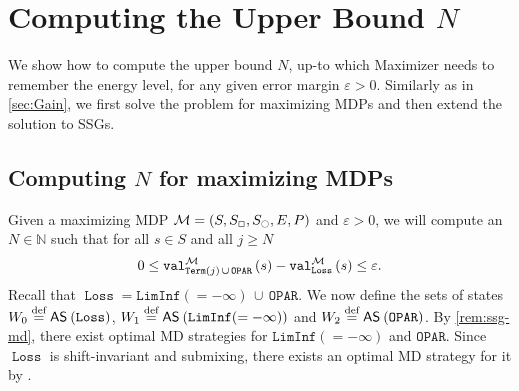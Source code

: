 \documentclass[a4paper,UKenglish,cleveref,autoref,thm-restate]{lipics-v2021}
\DeclareMathOperator{\Term}{\mathtt{Term}}
\DeclareMathOperator{\Loss}{\mathtt{Loss}}
\newcommand{\Oparity}{\mathtt{OPAR}}
\newcommand{\LimInf}[2]{\mathtt{LimInf}(#1 #2)}
\newcommand{\+}[1]{\mathbb{#1}}
\newcommand{\?}[1]{\mathcal{#1}}
\newcommand{\N}{\+{N}}
\newcommand{\rsymbol}{\ocircle}
\newcommand{\zsymbol}{\Box}
\newcommand{\zstates}{\states_\zsymbol}
\newcommand{\rstates}{\states_\rsymbol}
\newcommand{\eqby}[2][=]{\stackrel{\text{{\tiny{#2}}}}{#1}}
\newcommand{\eqdef}{\eqby{def}}
\newcommand{\eps}{\varepsilon}
\newcommand{\lrc}[1]{\left(#1\right)}
\newcommand{\tuple}[1]{\lrc{#1}}
\newcommand{\mdp}{{\mathcal M}}
\newcommand{\mdptuple}{\tuple{\states,\zstates,\rstates,\transition,\probp}}
\newcommand{\states}{S}
\newcommand{\s}{s}
\newcommand{\transition}{{E}}
\newcommand{\probp}{P}
\newcommand{\AS}[2][]{\mathsf{AS}^{#1}\left(#2\right)}
\begin{document}
\section{Computing the Upper Bound \texorpdfstring{$N$}{N}}\label{sec:Computing N}

We show how to compute the upper bound $N$, up-to which Maximizer needs to
remember the energy level, for any given error margin $\eps >0$.
Similarly as in \cref{sec:Gain}, we first solve the problem for maximizing
MDPs and then extend the solution to SSGs.

\subsection{Computing \texorpdfstring{$N$}{N} for maximizing MDPs}
Given a maximizing MDP $\mdp = \mdptuple$ and $\eps > 0$,
we will compute an $N \in \N$ such that for all $\s \in \states$ and all $j \ge N$
\[
	0 \le \valueof[\mdp][\Term(j)\,\cup\,\Oparity]{\s} - \valueof[\mdp][\Loss]{\s} \le \eps.
\]
Recall that $\Loss = \LimInf{=}{-\infty}\, \cup\, \Oparity$.
We now define the sets of states 
$W_0 \eqdef \AS{\Loss}$, $W_1 \eqdef \AS{\LimInf{=}{-\infty}}$ and $W_2 \eqdef \AS{\Oparity}$.
By \cref{rem:ssg-md}, there exist optimal MD strategies for
$\LimInf{=}{-\infty}$ and $\Oparity$.
Since $\Loss$ is shift-invariant and submixing, there exists an optimal MD
strategy for it by \cite[Theorem 1.1]{GK2022}.
\end{document}
